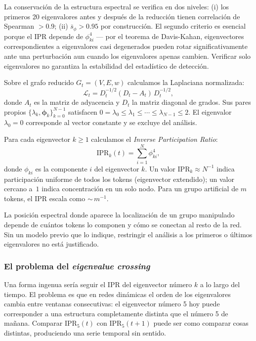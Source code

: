 La conservación de la estructura espectral se verifica en dos niveles:
(i) los primeros 20 eigenvalores antes y después de la reducción tienen
correlación de Spearman $> 0.9$; (ii) $\bar{s}_\phi > 0.95$ por
construcción. El segundo criterio es esencial porque el IPR depende de
$\phi_{ki}^4$ — por el teorema de Davis-Kahan, eigenvectores
correspondientes a eigenvalores casi degenerados pueden rotar
significativamente ante una perturbación aun cuando los eigenvalores
apenas cambien. Verificar solo eigenvalores no garantiza la estabilidad
del estadístico de detección.

Sobre el grafo reducido $G_t = (V, E, w)$ calculamos la Laplaciana
normalizada:
\begin{equation}
  \mathcal{L}_t = D_t^{-1/2}(D_t - A_t)\,D_t^{-1/2},
  \label{eq:laplacian}
\end{equation}
donde $A_t$ es la matriz de adyacencia y $D_t$ la matriz diagonal de grados.
Sus pares propios $\{\lambda_k, \boldsymbol{\phi}_k\}_{k=0}^{N-1}$ satisfacen
$0 = \lambda_0 \leq \lambda_1 \leq \cdots \leq \lambda_{N-1} \leq 2$.
El eigenvalor $\lambda_0 = 0$ corresponde al vector constante y se excluye
del análisis.

Para cada eigenvector $k \geq 1$ calculamos el \emph{Inverse Participation
Ratio}:
\begin{equation}
  \mathrm{IPR}_k(t) = \sum_{i=1}^{N} \phi_{ki}^4,
  \label{eq:ipr}
\end{equation}
donde $\phi_{ki}$ es la componente $i$ del eigenvector $k$. Un valor
$\mathrm{IPR}_k \approx N^{-1}$ indica participación uniforme de todos
los tokens (eigenvector extendido); un valor cercano a~$1$ indica
concentración en un solo nodo. Para un grupo artificial de $m$ tokens,
el IPR escala como ${\sim}\,m^{-1}$.

La posición espectral donde aparece la localización de un grupo manipulado
depende de cuántos tokens lo componen y cómo se conectan al resto de la
red. Sin un modelo previo que lo indique, restringir el análisis a los
primeros o últimos eigenvalores no está justificado.

\subsubsection*{El problema del \emph{eigenvalue crossing}}

Una forma ingenua sería seguir el IPR del eigenvector número $k$ a lo largo
del tiempo. El problema es que en redes dinámicas el orden de los eigenvalores
cambia entre ventanas consecutivas: el eigenvector número 5 hoy puede
corresponder a una estructura completamente distinta que el número 5 de mañana.
Comparar $\mathrm{IPR}_5(t)$ con $\mathrm{IPR}_5(t+1)$ puede ser como comparar
cosas distintas, produciendo una serie temporal sin sentido.

